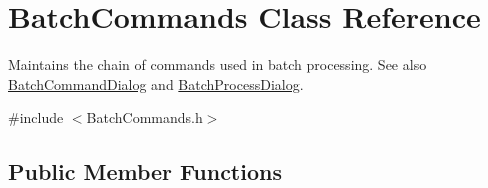 \hypertarget{class_batch_commands}{}\section{Batch\+Commands Class Reference}
\label{class_batch_commands}


Maintains the chain of commands used in batch processing. See also \hyperlink{class_batch_command_dialog}{Batch\+Command\+Dialog} and \hyperlink{class_batch_process_dialog}{Batch\+Process\+Dialog}.  




{\ttfamily \#include $<$Batch\+Commands.\+h$>$}

\subsection*{Public Member Functions}

